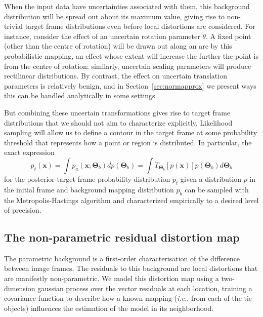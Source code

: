 \documentclass[manuscript]{aastex}
\newcommand{\bsT}{\boldsymbol\Theta}
\begin{document}
When the input data have uncertainties associated with them, this background distribution will be spread out about its maximum value, giving rise to non-trivial target frame distributions even before local distortions are considered. For instance, consider the effect of an uncertain rotation parameter $\theta$. A fixed point (other than the centre of rotation) will be drawn out along an arc by this probabilistic mapping, an effect whose extent will increase the further the point is from the centre of rotation; similarly, uncertain scaling parameters will produce rectilinear distributions. By contrast, the effect on uncertain translation parameters is relatively benign, and in Section~\ref{sec:normapprox} we present ways this can be handled analytically in some settings.

But combining these uncertain transformations gives rise to target frame distributions that we should not aim to characterize explicitly. Likelihood sampling will allow us to define a contour in the target frame at some probability threshold that represents how a point or region is distributed. In particular, the exact expression
\begin{equation}
p_t(\mathbf{x}) = \int p_a(\mathbf{x};\bsT_b) dp(\bsT_b) = \int T_{\bsT_b}\left[p(\mathbf{x})\right]p(\bsT_b) d\bsT_b\label{eq:pt_background}
\end{equation}
for the posterior target frame probability distribution $p_t$ given a distribution $p$ in the initial frame and background mapping distribution $p_b$ can be sampled with the Metropolis-Hastings algorithm and characterized empirically to a desired level of precision.

\subsection{The non-parametric residual distortion map}\label{ss:np}
The parametric background is a first-order characterisation of the difference between image frames. The residuals to this background are local distortions that are manifestly non-parametric. We model this distortion map using a two-dimension gaussian process over the vector residuals at each location, training a covariance function to describe how a known mapping (\emph{i.e.}, from each of the tie objects) influences the estimation of the model in its neighborhood. 
\end{document}
